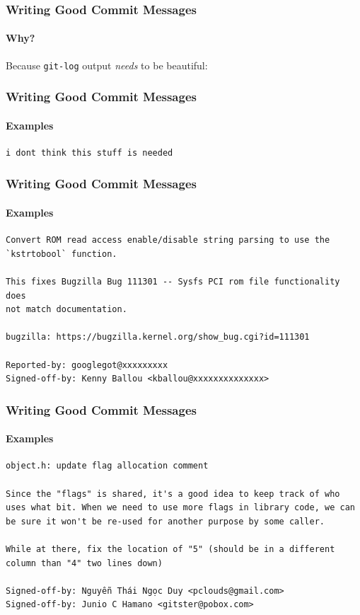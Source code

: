 \documentclass{beamer}
\begin{document}
\begin{frame}[fragile]
\frametitle{Writing Good Commit Messages}
\framesubtitle{Why?}
Because \texttt{git-log} output \textit{needs} to be beautiful:

\end{frame}

\begin{frame}[fragile]
  \frametitle{Writing Good Commit Messages}
  \framesubtitle{Examples}
\begin{Verbatim}[fontsize=\small]
i dont think this stuff is needed
\end{Verbatim}
\end{frame}

\begin{frame}[fragile]
  \frametitle{Writing Good Commit Messages}
  \framesubtitle{Examples}
\begin{Verbatim}[fontsize=\scriptsize]
Convert ROM read access enable/disable string parsing to use the
`kstrtobool` function.

This fixes Bugzilla Bug 111301 -- Sysfs PCI rom file functionality does
not match documentation.

bugzilla: https://bugzilla.kernel.org/show_bug.cgi?id=111301

Reported-by: googlegot@xxxxxxxxx
Signed-off-by: Kenny Ballou <kballou@xxxxxxxxxxxxxx>
\end{Verbatim}
\end{frame}

\begin{frame}[fragile]
  \frametitle{Writing Good Commit Messages}
  \framesubtitle{Examples}
\begin{Verbatim}[fontsize=\scriptsize]
object.h: update flag allocation comment

Since the "flags" is shared, it's a good idea to keep track of who
uses what bit. When we need to use more flags in library code, we can
be sure it won't be re-used for another purpose by some caller.

While at there, fix the location of "5" (should be in a different
column than "4" two lines down)

Signed-off-by: Nguyễn Thái Ngọc Duy <pclouds@gmail.com>
Signed-off-by: Junio C Hamano <gitster@pobox.com>
\end{Verbatim}
\end{frame}
\end{document}
